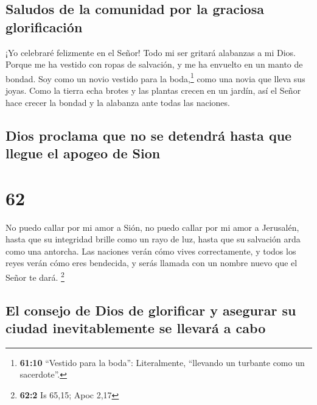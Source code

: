 \hypertarget{saludos-de-la-comunidad-por-la-graciosa-glorificaciuxf3n}{%
\subsection{Saludos de la comunidad por la graciosa
glorificación}\label{saludos-de-la-comunidad-por-la-graciosa-glorificaciuxf3n}}

 ¡Yo celebraré felizmente en el Señor! Todo mi ser
gritará alabanzas a mi Dios. Porque me ha vestido con ropas de
salvación, y me ha envuelto en un manto de bondad. Soy como un novio
vestido para la boda,\footnote{\textbf{61:10} ``Vestido para la boda'':
  Literalmente, ``llevando un turbante como un sacerdote''.} como una
novia que lleva sus joyas.  Como la tierra echa brotes y
las plantas crecen en un jardín, así el Señor hace crecer la bondad y la
alabanza ante todas las naciones.

\hypertarget{dios-proclama-que-no-se-detendruxe1-hasta-que-llegue-el-apogeo-de-sion}{%
\subsection{Dios proclama que no se detendrá hasta que llegue el apogeo
de
Sion}\label{dios-proclama-que-no-se-detendruxe1-hasta-que-llegue-el-apogeo-de-sion}}

\hypertarget{section-61}{%
\section{62}\label{section-61}}

 No puedo callar por mi amor a Sión, no puedo callar por
mi amor a Jerusalén, hasta que su integridad brille como un rayo de luz,
hasta que su salvación arda como una antorcha.  Las
naciones verán cómo vives correctamente, y todos los reyes verán cómo
eres bendecida, y serás llamada con un nombre nuevo que el Señor te
dará. \footnote{\textbf{62:2} Is 65,15; Apoc 2,17}

\hypertarget{el-consejo-de-dios-de-glorificar-y-asegurar-su-ciudad-inevitablemente-se-llevaruxe1-a-cabo}{%
\subsection{El consejo de Dios de glorificar y asegurar su ciudad
inevitablemente se llevará a
cabo}\label{el-consejo-de-dios-de-glorificar-y-asegurar-su-ciudad-inevitablemente-se-llevaruxe1-a-cabo}}

